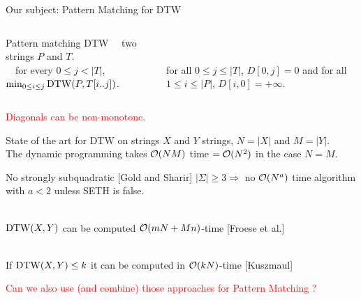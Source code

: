 \begin{frame}{Our subject: Pattern Matching for DTW}

    \begin{columns}
    \begin{mydefblock}{Pattern matching DTW}
        ~~two strings $P$ and $T$.\\ 
        ~~for every $0 \leq j < |T|$, 
        ~~~$\min_{0 \leq i \leq j} \mathrm{DTW}(P,T[i..j])$.
    \end{mydefblock}
    
    \vfill
    \\
    \smallskip
    \\
    for all $0\leq j\leq |T|$, $D[0,j]= 0$ and 
    for all $1 \leq i \leq |P|$, $D[i,0]=+\infty$.\\
    \vfill
    \end{columns}
    \pause
    
    \bigskip
    
    
    \begin{center}
        \pause
        \medskip
        \small{\textcolor{red}{Diagonals can be non-monotone.}}
    \end{center}
    
\end{frame}


\begin{frame}{State of the art for DTW on strings}
    $X$ and $Y$ strings, $N=|X|$ and $M=|Y|$.
    \\
    \smallskip
    The dynamic programming takes $\mathcal{O}(NM)$ time $=\mathcal{O}(N^2)$ in the case $N=M$.\\ \pause
    \begin{block}{No strongly subquadratic [Gold and Sharir]}
    $|\Sigma| \geq 3 \Rightarrow $ no $\mathcal{O}(N^{a})$ time algorithm with $a<2$ unless SETH is false.
    \end{block}\pause

     \\
    $\mathrm{DTW}(X,Y)$ can be computed $\mathcal{O}(mN+Mn)$-time [Froese et al.] 
    
    \smallskip
    \\
    If $\mathrm{DTW}(X,Y) \leq k$ it can be computed in $\mathcal{O}(kN)$-time [Kuszmaul]
    
    \medskip

    \textcolor{red}{Can we also use (and combine) those approaches for Pattern Matching ?}

\end{frame}

